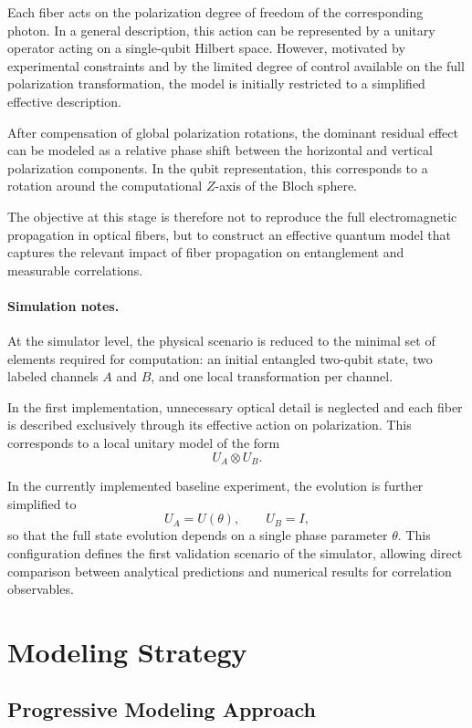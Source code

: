 \documentclass[a4paper]{article}
\begin{document}
Each fiber acts on the polarization degree of freedom of the corresponding photon. In a general description, this action can be represented by a unitary operator acting on a single-qubit Hilbert space. However, motivated by experimental constraints and by the limited degree of control available on the full polarization transformation, the model is initially restricted to a simplified effective description.

After compensation of global polarization rotations, the dominant residual effect can be modeled as a relative phase shift between the horizontal and vertical polarization components. In the qubit representation, this corresponds to a rotation around the computational \(Z\)-axis of the Bloch sphere.

The objective at this stage is therefore not to reproduce the full electromagnetic propagation in optical fibers, but to construct an effective quantum model that captures the relevant impact of fiber propagation on entanglement and measurable correlations.

\paragraph{Simulation notes.}
At the simulator level, the physical scenario is reduced to the minimal set of elements required for computation: an initial entangled two-qubit state, two labeled channels \(A\) and \(B\), and one local transformation per channel.

In the first implementation, unnecessary optical detail is neglected and each fiber is described exclusively through its effective action on polarization. This corresponds to a local unitary model of the form
\[
U_A \otimes U_B.
\]

In the currently implemented baseline experiment, the evolution is further simplified to
\[
U_A = U(\theta),
\qquad
U_B = I,
\]
so that the full state evolution depends on a single phase parameter \(\theta\). This configuration defines the first validation scenario of the simulator, allowing direct comparison between analytical predictions and numerical results for correlation observables.

\section{Modeling Strategy}

\subsection{Progressive Modeling Approach}
\end{document}

